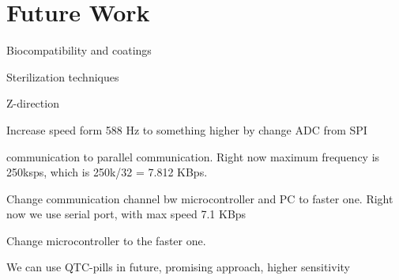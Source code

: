 \chapter{Future Work}
\label{futWork} %

Biocompatibility and coatings

Sterilization techniques

Z-direction

Increase speed form 588 Hz to something higher by change ADC from SPI 

communication to parallel communication. Right now maximum frequency is 250ksps, which is 250k/32 = 7.812 KBps.

 Change communication channel bw microcontroller and PC to faster one. Right now we use serial port, with max speed 7.1 KBps 
 
Change microcontroller to the faster one. 

We can use QTC-pills in future, promising approach, higher sensitivity 

